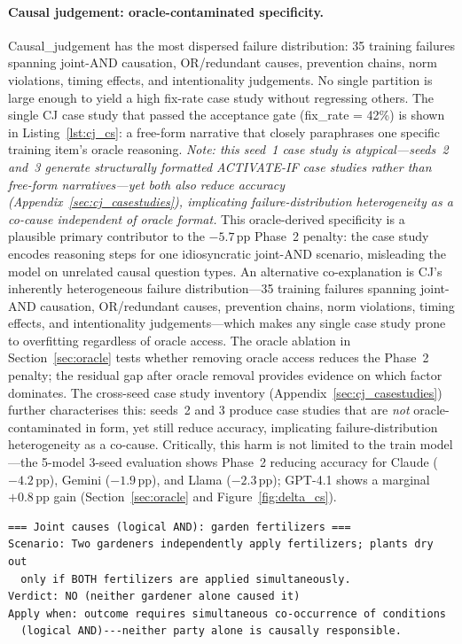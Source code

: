 \documentclass{article}
\begin{document}
\paragraph{Causal judgement: oracle-contaminated specificity.}
Causal\_judgement has the most dispersed failure distribution: 35 training failures spanning
joint-AND causation, OR/redundant causes, prevention chains, norm violations, timing effects,
and intentionality judgements.
No single partition is large enough to yield a high fix-rate case study without regressing
others.
The single CJ case study that passed the acceptance gate (fix\_rate = 42\%) is shown in
Listing~\ref{lst:cj_cs}: a free-form narrative that closely paraphrases one specific training
item's oracle reasoning. \emph{Note: this seed~1 case study is atypical---seeds~2 and~3 generate
structurally formatted ACTIVATE-IF case studies rather than free-form narratives---yet both
also reduce accuracy (Appendix~\ref{sec:cj_casestudies}), implicating failure-distribution
heterogeneity as a co-cause independent of oracle format.}
This oracle-derived specificity is a plausible primary contributor to the $-5.7$\,pp Phase~2
penalty: the case study encodes reasoning steps for one idiosyncratic joint-AND scenario,
misleading the model on unrelated causal question types.
An alternative co-explanation is CJ's inherently heterogeneous failure distribution---35 training
failures spanning joint-AND causation, OR/redundant causes, prevention chains, norm violations,
timing effects, and intentionality judgements---which makes any single case study prone to
overfitting regardless of oracle access.
The oracle ablation in Section~\ref{sec:oracle} tests whether removing oracle access reduces
the Phase~2 penalty; the residual gap after oracle removal provides evidence on which factor
dominates.
The cross-seed case study inventory (Appendix~\ref{sec:cj_casestudies}) further characterises
this: seeds~2 and 3 produce case studies that are \emph{not} oracle-contaminated in form,
yet still reduce accuracy, implicating failure-distribution heterogeneity as a co-cause.
Critically, this harm is not limited to the train model---the 5-model 3-seed evaluation shows
Phase~2 reducing accuracy for Claude ($-4.2$\,pp), Gemini ($-1.9$\,pp), and Llama ($-2.3$\,pp);
GPT-4.1 shows a marginal $+0.8$\,pp gain (Section~\ref{sec:oracle} and Figure~\ref{fig:delta_cs}).

\begin{lstlisting}[caption={The single Phase-2 case study generated for causal\_judgement (v3).
  Free-form prose paraphrasing one training item's oracle reasoning, encoding the train
  model's idiosyncratic treatment of joint-AND causation.},
  label={lst:cj_cs}]
=== Joint causes (logical AND): garden fertilizers ===
Scenario: Two gardeners independently apply fertilizers; plants dry out
  only if BOTH fertilizers are applied simultaneously.
Verdict: NO (neither gardener alone caused it)
Apply when: outcome requires simultaneous co-occurrence of conditions
  (logical AND)---neither party alone is causally responsible.
\end{lstlisting}
\end{document}
